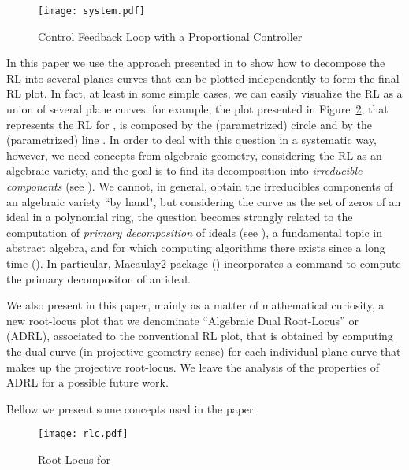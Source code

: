 \documentclass{article}
\begin{document}
\begin{figure}
\begin{center}
\texttt{[image: system.pdf]}
\caption{\label{cloop}Control Feedback Loop with a Proportional Controller}
\end{center}
\end{figure} 

In this paper we use the approach presented in \cite{pjrl} to show how to decompose the RL into several
planes curves that can be plotted independently to form the final RL plot. In fact, at least in some simple cases, 
we can easily visualize the RL as a union of several plane curves: for example, 
the plot presented in Figure~\ref{rlc}, that represents the RL for , 
is composed by the (parametrized) circle  and by the (parametrized) line . In order to deal with this 
question in a systematic way, however, we need concepts from algebraic geometry, considering
the RL as an algebraic variety, and the goal is to find its decomposition into {\em irreducible components} 
(see \cite[Chap. 4]{clo}).
We cannot, in general, obtain the irreducibles components of an algebraic variety ``by hand", 
but considering the curve as the set of zeros of an ideal in a polynomial ring, the question
becomes strongly related to the computation of {\em primary decomposition} of ideals (see \cite[Chaps. 4,7]{am}), 
a fundamental topic in abstract algebra, and for which computing algorithms there exists
since a long time (\cite{wiki}). In particular, 
Macaulay2 package (\cite{mac}) incorporates a command to
compute the primary decompositon of an ideal.

We also present in this paper, mainly as a matter of mathematical curiosity, a new root-locus plot that we denominate
``Algebraic Dual Root-Locus'' or (ADRL), associated to the conventional RL plot, that is 
obtained by computing the dual curve (in projective geometry sense) 
for each individual plane curve that makes up the 
projective root-locus. We leave the analysis of the properties of ADRL for a possible future work. 

Bellow we present some concepts used in the paper: 

\begin{figure}
\begin{center}
\texttt{[image: rlc.pdf]} 
\caption{\label{rlc} Root-Locus for } 
\end{center}
\end{figure} 
\end{document}

